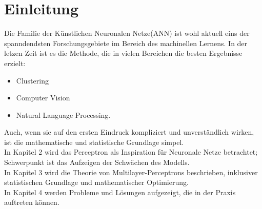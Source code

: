 
\section{Einleitung}
Die Familie der Künstlichen Neuronalen Netze(ANN) ist wohl aktuell eins der spanndendsten Forschungsgebiete im Bereich des machinellen Lernens. In der letzen Zeit ist es die Methode, die in vielen Bereichen die besten Ergebnisse erzielt: 

\begin{itemize}
\item Clustering
\item Computer Vision
\item Natural Language Processing.
\end{itemize}

Auch, wenn sie auf den ersten Eindruck kompliziert und unverständlich wirken, ist die mathematische und statistische Grundlage simpel.\\
In Kapitel 2 wird das Perceptron als Inspiration für Neuronale Netze betrachtet; Schwerpunkt ist das Aufzeigen der Schwächen des Modells. \\
In Kapitel 3 wird die Theorie von Multilayer-Perceptrons beschrieben, inklusiver statistischen Grundlage und mathematischer Optimierung. \\
In Kapitel 4 werden Probleme und Lösungen aufgezeigt, die in der Praxis auftreten können.
